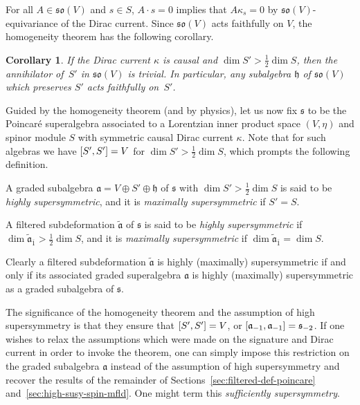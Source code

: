 \documentclass[11pt]{article}
\numberwithin{equation}{section}
\numberwithin{equation}{section}
\newtheorem{Corollary}[Theorem]{Corollary}
\newcommand{\fa}{\mathfrak{a}}
\newcommand{\fh}{\mathfrak{h}}
\newcommand{\fs}{\mathfrak{s}}
\newcommand{\fso}{\mathfrak{so}}
\newcommand{\fatilde}{\widetilde{\fa}}
\newcommand{\1}{\mathbbm{1}}
\begin{document}
For all $A\in\fso(V)$ and $s\in S$, $A\cdot s=0$ implies that $A \kappa_s=0$ by $\fso(V)$-equivariance of the Dirac current. Since $\fso(V)$ acts faithfully on $V$, the homogeneity theorem has the following corollary.

\begin{Corollary}\label{coro:homog-faithful}
	If the Dirac current $\kappa$ is causal and $\dim S'>\frac{1}{2}\dim S$, then the annihilator of~$S'$ in $\fso(V)$ is trivial. In particular, any subalgebra $\fh$ of $\fso(V)$ which preserves $S'$ acts faithfully on~$S'$.
\end{Corollary}

Guided by the homogeneity theorem (and by physics), let us now fix $\fs$ to be the Poincar\'e superalgebra associated to a Lorentzian inner product space $(V,\eta)$ and spinor module $S$ with symmetric causal Dirac current $\kappa$. Note that for such algebras we have $\comm{S'}{S'}=V$ for $\dim S'>\frac{1}{2}\dim S$, which prompts the following definition.

\begin{Definition}
	A graded subalgebra $\fa=V\oplus S'\oplus\fh$ of $\fs$ with $\dim S'> \frac{1}{2}\dim S$ is said to be \emph{highly supersymmetric}, and it is \emph{maximally supersymmetric} if $S'=S$.
	
	A filtered subdeformation $\fatilde$ of $\fs$ is said to be \emph{highly supersymmetric} if $\dim \fatilde_{\overline 1}> \frac{1}{2}\dim S$, and it is \emph{maximally supersymmetric} if $\dim \fatilde_{\overline 1} = \dim S$.
\end{Definition}

Clearly a filtered subdeformation $\fatilde$ is highly (maximally) supersymmetric if and only if its associated graded superalgebra $\fa$ is highly (maximally) supersymmetric as a graded subalgebra of $\fs$.

\begin{Remark}\label{rem:relaxing-homogeneity-assumption}
	The significance of the homogeneity theorem and the assumption of high supersymmetry is that they ensure that $\comm{S'}{S'}=V$, or $\comm{\fa_{-1}}{\fa_{-1}}=\fs_{-2}$. If one wishes to relax the assumptions which were made on the signature and Dirac current in order to invoke the theorem, one can simply impose this restriction on the graded subalgebra $\fa$ instead of the assumption of high supersymmetry and recover the results of the remainder of Sections~\ref{sec:filtered-def-poincare} and~\ref{sec:high-susy-spin-mfld}. One might term this \emph{sufficiently supersymmetry}.
\end{Remark}
\end{document}
